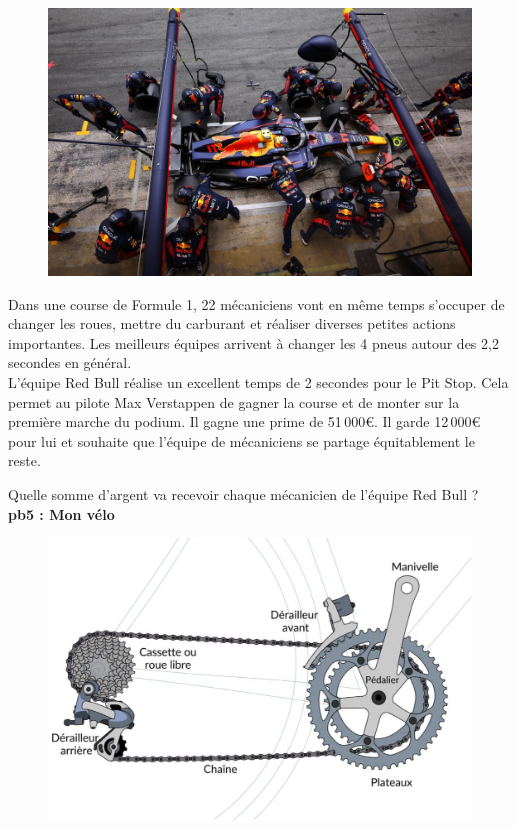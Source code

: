 \begin{multicols}{2} 
  \begin{figure}[H]
    \centering
    \includegraphics[width=0.8\linewidth]{5x2-inegalite-triangulaire/f1.png}
  \end{figure}  \columnbreak

  Dans une course de Formule 1, 22 mécaniciens vont en même temps s'occuper de changer les roues, mettre du carburant et réaliser diverses petites actions importantes. Les meilleurs équipes arrivent à changer les 4 pneus autour des 2,2 secondes en général. \\

  L'équipe Red Bull réalise un excellent temps de 2 secondes pour le Pit Stop. Cela permet au pilote Max Verstappen de gagner la course et de monter sur la première marche du podium. Il gagne une prime de 51\,000€. Il garde 12\,000€ pour lui et souhaite que l'équipe de mécaniciens se partage équitablement le reste. \\
\end{multicols}

Quelle somme d'argent va recevoir chaque mécanicien de l'équipe Red Bull ?\\

\textbf{pb5 : Mon vélo} \\

\begin{figure}[H]
  \centering
  \includegraphics[width=0.4\linewidth]{5x2-inegalite-triangulaire/velo.jpg}
\end{figure} 

